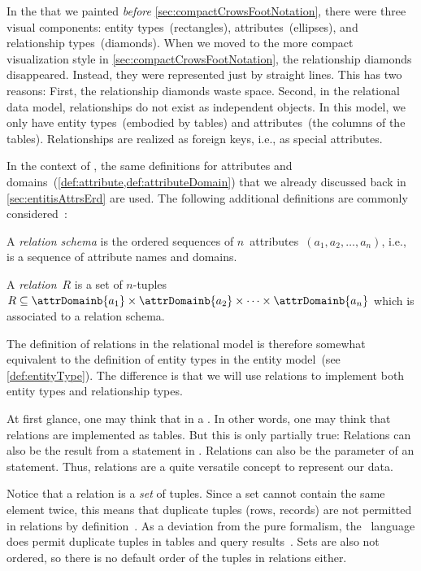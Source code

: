 %
\label{sec:relationalModel}%
%
In the  that we painted \emph{before} \cref{sec:compactCrowsFootNotation}, there were three visual components:
entity types~(rectangles), attributes~(ellipses), and relationship types~(diamonds).
When we moved to the more compact visualization style in \cref{sec:compactCrowsFootNotation}, the relationship diamonds disappeared.
Instead, they were represented just by straight lines.
This has two reasons:
First, the relationship diamonds waste space.
Second, in the relational data model, relationships do not exist as independent objects.
In this model, we only have entity types~(embodied by tables) and attributes~(the columns of the tables).
Relationships are realized as foreign keys, i.e., as special attributes.

In the context of , the same definitions for attributes and domains~(\cref{def:attribute,def:attributeDomain}) that we already discussed back in \cref{sec:entitisAttrsErd} are used.
The following additional definitions are commonly considered~\cite{C1970ARMODFLSDB}:%
%
\begin{definition}%
\sloppy%
A \emph{relation schema} is the ordered sequences of $n$~attributes~$(a_1, a_2, \dots, a_n)$, i.e., is a sequence of attribute names and domains.%
\end{definition}%
\fussy%
%
\begin{definition}[Relation]%
\label{def:rdb:relation}%
A \emph{relation}~$R$ is a set of $n$\nobreakdashes-tuples $R\subseteq\attrDomainb{a_1}\times\attrDomainb{a_2}\times\dots\times\attrDomainb{a_n}$ which is associated to a relation schema.%
\end{definition}%
%
The definition of relations in the relational model is therefore somewhat equivalent to the definition of entity types in the entity model~(see \cref{def:entityType}).
The difference is that we will use relations to implement both entity types and relationship types.

At first glance, one may think that  in a \db.
In other words, one may think that relations are implemented as tables.
But this is only partially true:
Relations can also be the result from a  statement in \sql.
Relations can also be the parameter of an  statement.
Thus, relations are a quite versatile concept to represent our data.

Notice that a relation is a \emph{set} of tuples.
Since a set cannot contain the same element twice, this means that duplicate tuples (rows, records) are not permitted in relations by definition~\cite{C20245YOQ}.
As a deviation from the pure formalism, the \sql\ language does permit duplicate tuples in tables and query results~\cite{C20245YOQ}.
Sets are also not ordered, so there is no default order of the tuples in relations either.


